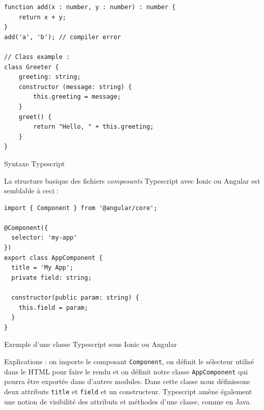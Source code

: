 \documentclass[a4paper, 12pt]{article}
\newenvironment{code}{\captionsetup{type=listing}}{}
\begin{document}
\begin{code}
    \begin{verbatim}
function add(x : number, y : number) : number {
    return x + y;
}
add('a', 'b'); // compiler error

// Class example :
class Greeter {
    greeting: string;
    constructor (message: string) {
        this.greeting = message;
    }
    greet() {
        return "Hello, " + this.greeting;
    }
}
    \end{verbatim}
    \caption{Syntaxe Typescript}
\end{code}
La structure basique des fichiers \textit{composants} Typescript avec Ionic ou Angular est semblable à ceci :
\begin{code}
    \begin{verbatim}
import { Component } from '@angular/core';

@Component({
  selector: 'my-app'
})
export class AppComponent {
  title = 'My App';
  private field: string;

  constructor(public param: string) {
    this.field = param;
  }
}
    \end{verbatim}
    \caption{Exemple d'une classe Typescript sous Ionic ou Angular}
\end{code}
Explications : on importe le composant \texttt{Component}, on définit le sélecteur utilisé dans le HTML
pour faire le rendu et on définit notre classe \texttt{AppComponent} qui pourra être exportée dans
d'autres modules. Dans cette classe nous définissons deux attributs \texttt{title} et
\texttt{field} et un constructeur. Typescript amène également une notion de visibilité des attributs 
et méthodes d'une classe, comme en Java.
\end{document}
